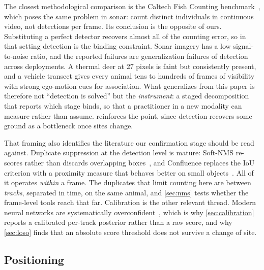 The closest methodological comparison is the Caltech Fish Counting
benchmark~\cite{kay2022caltech}, which poses the same problem in sonar: count distinct
individuals in continuous video, not detections per frame. Its conclusion is the opposite of
ours. Substituting a perfect detector recovers almost all of the counting error, so in that
setting detection is the binding constraint. Sonar imagery has a low signal-to-noise ratio, and the
reported failures are generalization failures of detection across deployments. A thermal
deer at 27 pixels is faint but consistently present, and a vehicle transect gives every
animal tens to hundreds of frames of visibility with strong ego-motion cues for association.
What generalizes from this paper is therefore not ``detection is solved'' but the
\emph{instrument}: a staged decomposition that reports which stage binds, so that a
practitioner in a new modality can measure rather than assume.  reinforces
the point, since detection recovers some ground as a bottleneck once sites change.

That framing also identifies the literature our confirmation stage should be read against.
Duplicate suppression at the detection level is mature: Soft-NMS re-scores rather than
discards overlapping boxes~\cite{bodla2017softnms}, and Confluence replaces the IoU
criterion with a proximity measure that behaves better on small
objects~\cite{shuai2021confluence}. All of it operates \emph{within} a frame. The duplicates
that limit counting here are between \emph{tracks}, separated in time, on the same animal,
and \cref{sec:nms} tests whether the frame-level tools reach that far. Calibration is the
other relevant thread. Modern neural networks are systematically
overconfident~\cite{guo2017calibration}, which is why \cref{sec:calibration} reports a
calibrated per-track posterior rather than a raw score, and why \cref{sec:loso} finds that
an absolute score threshold does not survive a change of site.

\subsection{Positioning}

